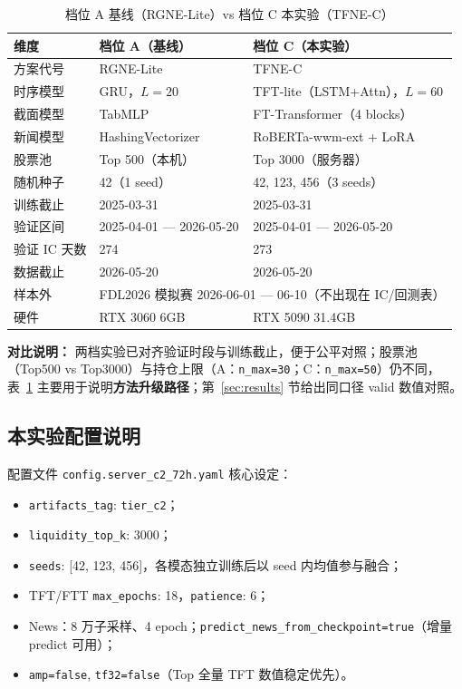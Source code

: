 \documentclass[UTF8,a4paper,12pt]{ctexart}
\begin{document}
\begin{table}[H]
\centering
\caption{档位 A 基线（RGNE-Lite）vs 档位 C 本实验（TFNE-C）}
\label{tab:vs-a}
\begin{tabular}{lll}
\toprule
\textbf{维度} & \textbf{档位 A（基线）} & \textbf{档位 C（本实验）} \\
\midrule
方案代号   & RGNE-Lite              & TFNE-C \\
时序模型   & GRU，$L=20$            & TFT-lite（LSTM+Attn），$L=60$ \\
截面模型   & TabMLP                 & FT-Transformer（4 blocks） \\
新闻模型   & HashingVectorizer      & RoBERTa-wwm-ext + LoRA \\
股票池     & Top 500（本机）        & Top 3000（服务器） \\
随机种子   & 42（1 seed）           & 42, 123, 456（3 seeds） \\
训练截止   & 2025-03-31             & 2025-03-31 \\
验证区间   & 2025-04-01 --- 2026-05-20 & 2025-04-01 --- 2026-05-20 \\
验证 IC 天数 & 274                  & 273 \\
数据截止   & 2026-05-20             & 2026-05-20 \\
样本外     & \multicolumn{2}{c}{FDL2026 模拟赛 2026-06-01 --- 06-10（不出现在 IC/回测表）} \\
硬件       & RTX 3060 6GB           & RTX 5090 31.4GB \\
\bottomrule
\end{tabular}
\end{table}

\textbf{对比说明：} 两档实验已对齐验证时段与训练截止，便于公平对照；股票池（Top500 vs Top3000）与持仓上限（A：\texttt{n\_max=30}；C：\texttt{n\_max=50}）仍不同，表~\ref{tab:vs-a} 主要用于说明\textbf{方法升级路径}；第~\ref{sec:results} 节给出同口径 valid 数值对照。

\subsection{本实验配置说明}

配置文件 \texttt{config.server\_c2\_72h.yaml} 核心设定：
\begin{itemize}[leftmargin=2em]
  \item \texttt{artifacts\_tag}: \texttt{tier\_c2}；
  \item \texttt{liquidity\_top\_k}: 3000；
  \item \texttt{seeds}: [42, 123, 456]，各模态独立训练后以 seed 内均值参与融合；
  \item TFT/FTT \texttt{max\_epochs}: 18，\texttt{patience}: 6；
  \item News：8 万子采样、4 epoch；\texttt{predict\_news\_from\_checkpoint=true}（增量 predict 可用）；
  \item \texttt{amp=false}, \texttt{tf32=false}（Top 全量 TFT 数值稳定优先）。
\end{itemize}
\end{document}
